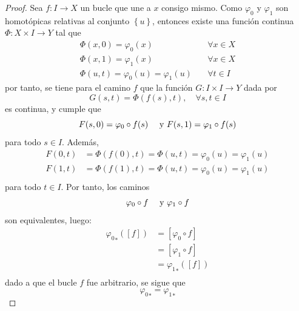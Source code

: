 \documentclass[12pt]{report}
\theoremstyle{largebreak}
\newcommand\cf[3]{\ensuremath{#1:#2\rightarrow#3}}
\begin{document}
    \begin{proof}
        Sea $\cf{f}{I}{X}$ un bucle que une a $x$ consigo mismo. Como $\varphi_0$ y $\varphi_1$ son homotópicas relativas al conjunto $\left\{u\right\}$, entonces existe una función continua $\cf{\Phi}{X\times I}{Y}$ tal que
        \begin{equation*}
            \begin{split}
                \Phi(x,0)=\varphi_0(x) & \quad\forall x\in X\\
                \Phi(x,1)=\varphi_1(x) & \quad\forall x\in X\\
                \Phi(u,t)=\varphi_0(u)=\varphi_1(u) & \quad\forall t\in I
            \end{split}
        \end{equation*}
        por tanto, se tiene para el camino $f$ que la función $\cf{G}{I\times I}{Y}$ dada por
        \begin{equation*}
            G(s,t)=\Phi(f(s),t),\quad\forall s,t\in I
        \end{equation*}
        es continua, y cumple que
        \begin{equation*}
            F(s,0)=\varphi_0\circ f(s)\quad\textup{ y }F(s,1)=\varphi_1\circ f(s)
        \end{equation*}
        para todo $s\in I$. Además,
        \begin{equation*}
            \begin{split}
                F(0,t)&=\Phi(f(0),t)=\Phi(u,t)=\varphi_0(u)=\varphi_1(u)\\
                F(1,t)&=\Phi(f(1),t)=\Phi(u,t)=\varphi_0(u)=\varphi_1(u)\\
            \end{split}
        \end{equation*}
        para todo $t\in I$. Por tanto, los caminos
        \begin{equation*}
            \varphi_0\circ f\quad\textup{ y }\varphi_1\circ f
        \end{equation*}
        son equivalentes, luego:
        \begin{equation*}
            \begin{split}
                {\varphi_0}_*([f])&=[\varphi_0\circ f]\\
                &=[\varphi_1\circ f]\\
                &={\varphi_1}_*([f])\\
            \end{split}
        \end{equation*}
        dado a que el bucle $f$ fue arbitrario, se sigue que
        \begin{equation*}
            {\varphi_0}_*={\varphi_1}_*
        \end{equation*}
    \end{proof}
\end{document}
